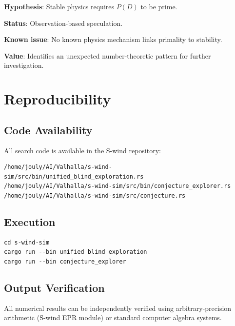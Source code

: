 \documentclass[11pt,a4paper]{article}
\begin{document}
\textbf{Hypothesis}: Stable physics requires $P(D)$ to be prime.

\textbf{Status}: Observation-based speculation.

\textbf{Known issue}: No known physics mechanism links primality to stability.

\textbf{Value}: Identifies an unexpected number-theoretic pattern for further investigation.

\section{Reproducibility}

\subsection{Code Availability}

All search code is available in the S-wind repository:
\begin{verbatim}
/home/jouly/AI/Valhalla/s-wind-sim/src/bin/unified_blind_exploration.rs
/home/jouly/AI/Valhalla/s-wind-sim/src/bin/conjecture_explorer.rs
/home/jouly/AI/Valhalla/s-wind-sim/src/conjecture.rs
\end{verbatim}

\subsection{Execution}

\begin{verbatim}
cd s-wind-sim
cargo run --bin unified_blind_exploration
cargo run --bin conjecture_explorer
\end{verbatim}

\subsection{Output Verification}

All numerical results can be independently verified using arbitrary-precision arithmetic (S-wind EPR module) or standard computer algebra systems.
\end{document}
